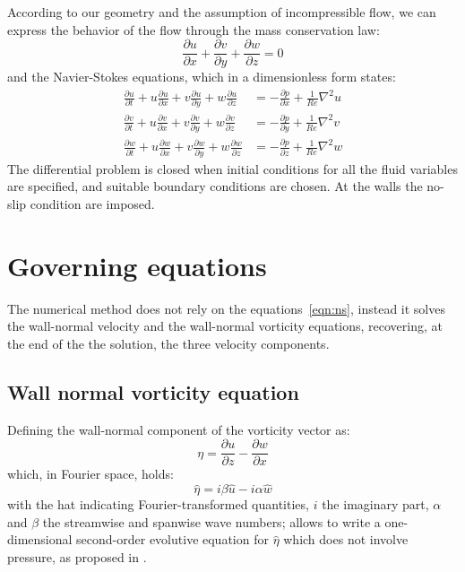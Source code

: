 According to our geometry and the assumption of incompressible flow, we can express the behavior of the flow through the mass conservation law:
\begin{equation}
\frac{\partial u}{\partial x} + \frac{\partial v}{\partial y} + \frac{\partial w}{\partial z} = 0
\label{mass:cons}
\end{equation}
 and the Navier-Stokes equations, which in a dimensionless form states:
\begin{subequations}
\label{eqn:ns}
\begin{align}
\frac{\partial u}{\partial t} + u\frac{\partial u}{\partial x} + v\frac{\partial u}{\partial y} + w\frac{\partial u}{\partial z} &= 
- \frac{\partial p}{\partial x} + \frac{1}{Re} \nabla^{2}u  \label{eqn:ns:1}\\
\frac{\partial v}{\partial t} + u\frac{\partial v}{\partial x} + v\frac{\partial v}{\partial y} + w\frac{\partial v}{\partial z} &= 
- \frac{\partial p}{\partial y} + \frac{1}{Re}\nabla^{2}v \label{eqn:ns:2}\\
\frac{\partial w}{\partial t} + u\frac{\partial w}{\partial x} + v\frac{\partial w}{\partial y} + w\frac{\partial w}{\partial z} &= 
- \frac{\partial p}{\partial z} + \frac{1}{Re}\nabla^{2}w \label{eqn:ns:3}
\end{align}
\end{subequations}
The differential problem is closed when initial conditions for all the fluid variables are specified, and suitable boundary conditions are chosen. At the walls the no-slip condition are imposed.








\section{Governing equations}
The numerical method does not rely on the equations~\eqref{eqn:ns}, instead it solves the wall-normal velocity and the wall-normal vorticity equations, recovering, at the end of the the solution, the three velocity components.\\
\subsection{Wall normal vorticity equation}
Defining the wall-normal component of the vorticity vector as:
\[
\eta = \frac{\partial u}{\partial z} - \frac{\partial w}{\partial x}
\]
which, in Fourier space, holds:
\[
\hat{\eta} = i\beta \hat{u} - i \alpha \hat{w}
\] 
with the hat indicating Fourier-transformed quantities, $i$ the imaginary part, $\alpha$ and $\beta$ the streamwise and spanwise wave numbers;  allows to write a one-dimensional second-order evolutive equation for $\hat{\eta}$ which does not involve pressure, as proposed in \cite{kim_moin_moser}.

